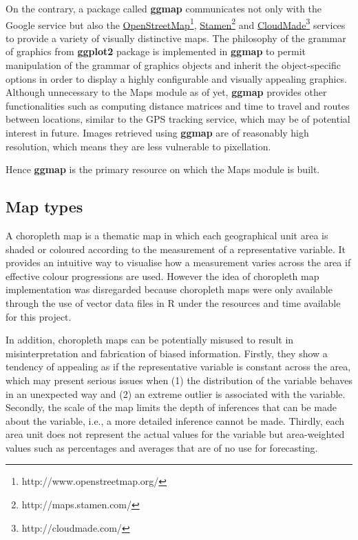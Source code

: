 \documentclass[a4paper, 12pt]{article}
\begin{document}
On the contrary, a package called \textbf{ggmap} \cite{ggmap} communicates not only with the Google service but also the \href{http://www.openstreetmap.org/}{OpenStreetMap}\footnote{http://www.openstreetmap.org/}, \href{http://maps.stamen.com/}{Stamen}\footnote{http://maps.stamen.com/} and \href{http://cloudmade.com/}{CloudMade}\footnote{http://cloudmade.com/} services to provide a variety of visually distinctive maps. The philosophy of the grammar of graphics from \textbf{ggplot2} \cite{ggplot2} package is implemented in \textbf{ggmap} to permit manipulation of the grammar of graphics objects and inherit the object-specific options in order to display a highly configurable and visually appealing graphics. Although unnecessary to the Maps module as of yet, \textbf{ggmap} provides other functionalities such as computing distance matrices and time to travel and routes between locations, similar to the GPS tracking service, which may be of potential interest in future. Images retrieved using \textbf{ggmap} are of reasonably high resolution, which means they are less vulnerable to pixellation.

Hence \textbf{ggmap} is the primary resource on which the Maps module is built.

\subsection{Map types}
\label{subsec:2.2}
A choropleth map is a thematic map in which each geographical unit area is shaded or coloured according to the measurement of a representative variable. It provides an intuitive way to visualise how a measurement varies across the area if effective colour progressions are used. However the idea of choropleth map implementation was disregarded because choropleth maps were only available through the use of vector data files in R under the resources and time available for this project.

In addition, choropleth maps can be potentially misused to result in misinterpretation and fabrication of biased information. Firstly, they show a tendency of appealing as if the representative variable is constant across the area, which may present serious issues when (1) the distribution of the variable behaves in an unexpected way and (2) an extreme outlier is associated with the variable. Secondly, the scale of the map limits the depth of inferences that can be made about the variable, i.e., a more detailed inference cannot be made. Thirdly, each area unit does not represent the actual values for the variable but area-weighted values such as percentages and averages that are of no use for forecasting.
\end{document}
